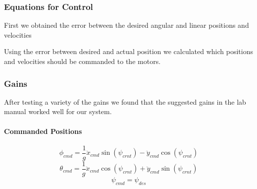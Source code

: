 \documentclass[english, twocolumn]{article}
\begin{document}
\subsubsection*{Equations for Control}
 First we obtained the error between the desired angular and linear positions and velocities 
\begin{table}[ht]
\end{table} 
\FloatBarrier 
Using the error between desired and actual position we calculated which positions and velocities should be commanded to the motors.
\subsubsection*{Gains}
 After testing a variety of the gains we found that the suggested gains in the lab manual worked well for our system.
\begin{table}[ht]
\end{table}
\FloatBarrier
\paragraph{Commanded Positions } 
$$\phi_{cmd} =   \frac{1}{g} \ddot{x}_{cmd} \sin(\psi_{crnt}) - \ddot{y}_{cmd}\cos(\psi_{crnt})$$
$$\theta_{cmd} =   \frac{1}{g} \ddot{x}_{cmd} \cos(\psi_{crnt}) + \ddot{y}_{cmd} \sin(\psi_{crnt})$$
$$\psi_{cmd} =   \psi_{des}$$
\end{document}
